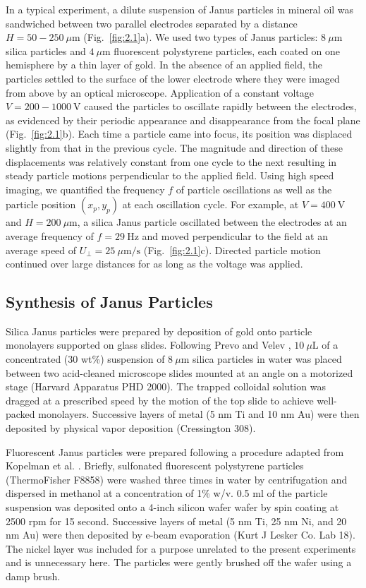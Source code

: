 In a typical experiment, a dilute suspension of Janus particles in mineral oil was sandwiched between two parallel  electrodes separated by a distance $H= 50 - 250~\mu\text{m}$ (Fig.~\ref{fig:2.1}a). 
We used two types of Janus particles: $8~\mu\text{m}$ silica particles and $4~\mu\text{m}$ fluorescent polystyrene particles, each coated on one hemisphere by a thin layer of gold.
In the absence of an applied field, the particles settled to the surface of the lower electrode where they were imaged from above by an optical microscope.
Application of a constant voltage $V = 200 - 1000~\text{V}$ caused the particles to oscillate rapidly between the electrodes, as evidenced by their periodic appearance and disappearance from the focal plane (Fig.~\ref{fig:2.1}b). 
Each time a particle came into focus, its position was displaced slightly from that in the previous cycle.
The magnitude and direction of these displacements was relatively constant from one cycle to the next resulting in steady particle motions perpendicular to the applied field.
Using high speed imaging, we quantified the frequency $f$ of particle oscillations as well as the particle position $(x_p,y_p)$ at each oscillation cycle.
For example, at $V = 400~\text{V}$ and $H=200~\mu\text{m}$, a silica Janus particle oscillated between the electrodes at an average frequency of $f = 29~\text{Hz}$ and moved perpendicular to the field at an average speed of $U_{\perp} = 25~\mu\text{m/s}$ (Fig.~\ref{fig:2.1}c).
Directed particle motion continued over large distances for as long as the voltage was applied.

\subsection{Synthesis of Janus Particles}

Silica Janus particles were prepared by  deposition of gold onto particle monolayers supported on glass slides.
Following Prevo and Velev \cite{prevo2004controlled}, $10~\mu\text{L}$ of a concentrated (30 wt\%) suspension of $8~\mu\text{m}$ silica particles in water was placed between two acid-cleaned microscope slides mounted at an angle on a motorized stage (Harvard Apparatus PHD 2000).
The trapped colloidal solution was dragged at a prescribed speed by the motion of the top slide to achieve well-packed monolayers.
Successive layers of metal (5 nm Ti and 10 nm Au) were then deposited by physical vapor deposition (Cressington 308).

Fluorescent Janus particles were prepared following a procedure adapted from Kopelman et al. \cite{Sinn2011}.
Briefly, sulfonated fluorescent polystyrene particles (ThermoFisher F8858) were washed three times in water by centrifugation and dispersed in methanol at a concentration of 1\% w/v. 
0.5 ml of the particle suspension was deposited onto a 4-inch silicon wafer wafer by spin coating at 2500 rpm for 15 second. 
Successive layers of metal (5 nm Ti, 25 nm Ni, and 20 nm Au) were then deposited by e-beam evaporation (Kurt J Lesker Co. Lab 18). 
The nickel layer was included for a purpose unrelated to the present experiments and is unnecessary here. 
The particles were gently brushed off the wafer using a damp brush.

